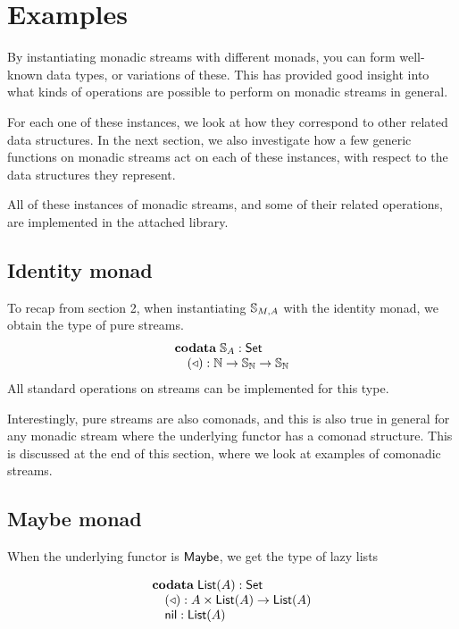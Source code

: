 \section{Examples}

By instantiating monadic streams with different monads, you can form well-known data types, or variations of these. This has provided good insight into what kinds of operations are possible to perform on monadic streams in general.

For each one of these instances, we look at how they correspond to other related data structures. In the next section, we also investigate how a few generic functions on monadic streams act on each of these instances, with respect to the data structures they represent.

All of these instances of monadic streams, and some of their related operations, are implemented in the attached library.

\subsection{Identity monad}

To recap from section 2, when instantiating $\mathbb{S}_{M,A}$ with the identity monad, we obtain the type of pure streams.
$$
\begin{array}[t]{l}
\mathbf{codata}\;
\mathbb{S}_{A}:\mathsf{Set}\\
\quad (\triangleleft): \mathbb{N}\rightarrow \mathbb{S}_{\mathbb{N}} \rightarrow\mathbb{S}_{\mathbb{N}}
\end{array}
$$
All standard operations on streams can be implemented for this type.

Interestingly, pure streams are also comonads, and this is also true in general for any monadic stream where the underlying functor has a comonad structure. This is discussed at the end of this section, where we look at examples of comonadic streams.

\subsection{Maybe monad}

When the underlying functor is $\mathsf{Maybe}$, we get the type of lazy lists

$$
\begin{array}[t]{l}
\mathbf{codata}\;
\mathsf{List}(A):\mathsf{Set}\\
\quad (\triangleleft): A\times \mathsf{List}(A)\rightarrow\mathsf{List}(A)\\
\quad \mathsf{nil}: \mathsf{List}(A)
\end{array}
$$

